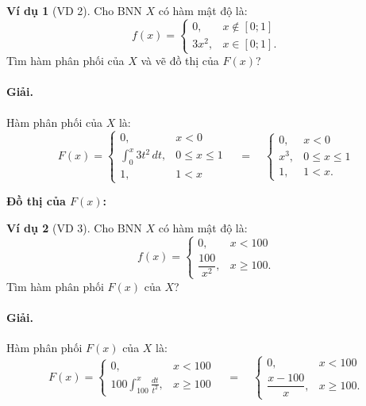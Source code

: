 \documentclass[12pt,a4paper]{article}
\theoremstyle{definition}
\newtheorem{vidu}{Ví dụ}[section]
\begin{document}
\begin{vidu}[VD 2]
Cho BNN $X$ có hàm mật độ là:
\[
f(x) = \begin{cases}
0, & x \notin [0; 1] \\
3x^2, & x \in [0; 1].
\end{cases}
\]
Tìm hàm phân phối của $X$ và vẽ đồ thị của $F(x)$?

\paragraph{Giải.} Hàm phân phối của $X$ là:
\[
F(x) = \begin{cases}
0, & x < 0 \\
\displaystyle\int_0^x 3t^2\,dt, & 0 \le x \le 1 \\
1, & 1 < x
\end{cases}
\quad = \quad
\begin{cases}
0, & x < 0 \\
x^3, & 0 \le x \le 1 \\
1, & 1 < x.
\end{cases}
\]

\textbf{Đồ thị của $F(x)$:}
\begin{center}
\end{center}
\end{vidu}

\begin{vidu}[VD 3]
Cho BNN $X$ có hàm mật độ là:
\[
f(x) = \begin{cases}
0, & x < 100 \\
\dfrac{100}{x^2}, & x \ge 100.
\end{cases}
\]
Tìm hàm phân phối $F(x)$ của $X$?

\paragraph{Giải.} Hàm phân phối $F(x)$ của $X$ là:
\[
F(x) = \begin{cases}
0, & x < 100 \\
100 \displaystyle\int_{100}^x \frac{dt}{t^2}, & x \ge 100
\end{cases}
\quad = \quad
\begin{cases}
0, & x < 100 \\
\dfrac{x - 100}{x}, & x \ge 100.
\end{cases}
\]
\end{vidu}
\end{document}

